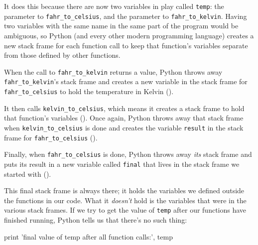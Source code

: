 It does this because there are now two variables in play called
\texttt{temp}: the parameter to \texttt{fahr\_to\_celsius}, and the
parameter to \texttt{fahr\_to\_kelvin}. Having two variables with the
same name in the same part of the program would be ambiguous, so Python
(and every other modern programming language) creates a new stack frame
for each function call to keep that function's variables separate from
those defined by other functions.

When the call to \texttt{fahr\_to\_kelvin} returns a value, Python
throws away \texttt{fahr\_to\_kelvin}'s stack frame and creates a new
variable in the stack frame for \texttt{fahr\_to\_celsius} to hold the
temperature in Kelvin ().



It then calls \texttt{kelvin\_to\_celsius}, which means it creates a
stack frame to hold that function's variables ().
Once again, Python throws away that stack frame when
\texttt{kelvin\_to\_celsius} is done and creates the variable
\texttt{result} in the stack frame for \texttt{fahr\_to\_celsius}
().


Finally, when \texttt{fahr\_to\_celsius} is done, Python throws away
\emph{its} stack frame and puts its result in a new variable called
\texttt{final} that lives in the stack frame we started with ().


This final stack frame is always there; it holds the variables we
defined outside the functions in our code. What it \emph{doesn't} hold
is the variables that were in the various stack frames. If we try to get
the value of \texttt{temp} after our functions have finished running,
Python tells us that there's no such thing:

\begin{VerbIn}
print 'final value of temp after all function calls:', temp
\end{VerbIn}

